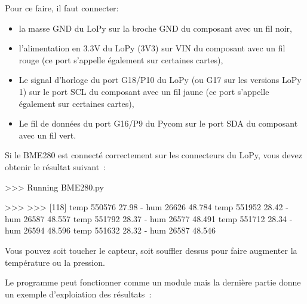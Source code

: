      \vspace{1em}

Pour ce faire, il faut connecter:
~\begin{itemize}
    \item la masse GND du LoPy sur la broche GND du composant avec un fil noir,
    \item l’alimentation en 3.3V du LoPy (3V3) sur VIN du composant avec un fil rouge (ce port s’appelle également  sur certaines cartes),
    \item Le signal d’horloge du port G18/P10 du LoPy (ou G17 sur les versions LoPy 1) sur le port SCL du composant avec un fil jaune (ce port s’appelle également  sur certaines cartes),
    \item Le fil de données du port G16/P9 du Pycom sur le port SDA du composant avec un fil vert.
\end{itemize}

Si le BME280 est connecté correctement sur les connecteurs du LoPy, vous devez obtenir le résultat suivant~:

\begin{termc}[backgroundcolor=\color{gray!10}, language=json, basicstyle=\ttfamily\tiny, escapechar=@]
>>> Running BME280.py

>>> 
>>> 
[118]
temp 550576 27.98  - hum 26626 48.784 %
temp 551952 28.42  - hum 26587 48.557 %
temp 551792 28.37  - hum 26577 48.491 %
temp 551712 28.34  - hum 26594 48.596 %
temp 551632 28.32  - hum 26587 48.546 %
\end{termc}

Vous pouvez soit toucher le capteur, soit souffler dessus pour faire augmenter la température ou la pression.

     \vspace{1em}


Le programme  peut fonctionner comme un module mais la dernière partie donne un exemple d'exploiation des résultats~:

